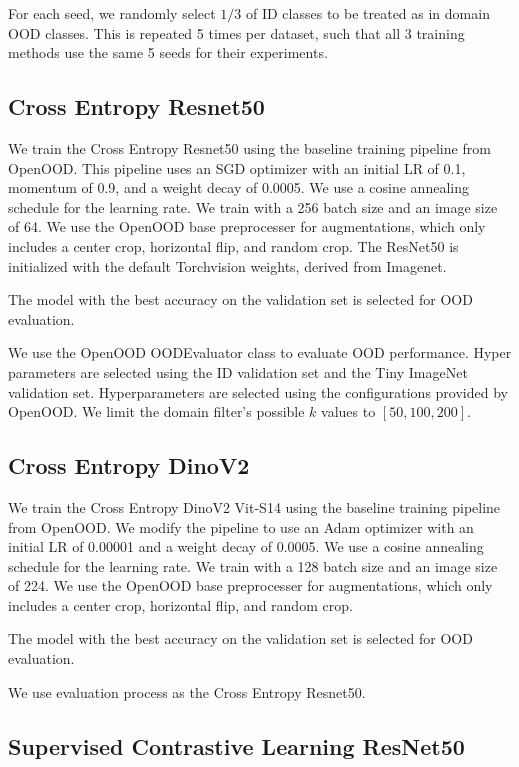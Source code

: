 \documentclass[letterpaper]{article} %
\theoremstyle{plain}
\theoremstyle{definition}
\theoremstyle{remark}
\begin{document}
For each seed, we randomly select $1/3$ of ID classes to be treated as in domain OOD classes. This is repeated 5 times per dataset, such that all 3 training methods use the same 5 seeds for their experiments. 

\subsection{Cross Entropy Resnet50}

We train the Cross Entropy Resnet50 using the baseline training pipeline from OpenOOD. This pipeline uses an SGD optimizer with an initial LR of 0.1, momentum of 0.9, and a weight decay of 0.0005. We use a cosine annealing schedule for the learning rate. We train with a 256 batch size and an image size of 64. We use the OpenOOD base preprocesser for augmentations, which only includes a center crop, horizontal flip, and random crop. The ResNet50 is initialized with the default Torchvision weights, derived from Imagenet. 

The model with the best accuracy on the validation set is selected for OOD evaluation. 

We use the OpenOOD OODEvaluator class to evaluate OOD performance. Hyper parameters are selected using the ID validation set and the Tiny ImageNet validation set. Hyperparameters are selected using the configurations provided by OpenOOD. We limit the domain filter's possible $k$ values to $[50, 100, 200]$. 

\subsection{Cross Entropy DinoV2}

We train the Cross Entropy DinoV2 Vit-S14 using the baseline training pipeline from OpenOOD. We modify the pipeline to use an Adam optimizer with an initial LR of 0.00001 and a weight decay of 0.0005. We use a cosine annealing schedule for the learning rate. We train with a 128 batch size and an image size of 224. We use the OpenOOD base preprocesser for augmentations, which only includes a center crop, horizontal flip, and random crop. 

The model with the best accuracy on the validation set is selected for OOD evaluation. 

We use evaluation process as the Cross Entropy Resnet50. 

\subsection{Supervised Contrastive Learning ResNet50}
\end{document}
